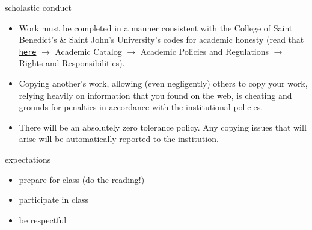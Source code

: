 \documentclass[10pt, t]{beamer}
\begin{document}
  \begin{frame}{scholastic conduct}
    \begin{itemize}
      \item Work must be completed in a manner consistent with the College of
        Saint Benedict's \& Saint John's University's codes for academic honesty
        (read that \href{http://www.csbsju.edu/academics}{\nolinkurl{here}}
        $\rightarrow$ Academic Catalog $\rightarrow$ Academic Policies and
        Regulations $\rightarrow$ Rights and Responsibilities).
      \item Copying another's work, allowing (even negligently) others to copy
        your work, relying heavily on information that you found on the web, is
        cheating and grounds for penalties in accordance with the institutional
        policies.
      \item There will be an absolutely zero tolerance policy. Any copying
        issues that will arise will be automatically reported to the
        institution.
    \end{itemize}
  \end{frame}

  \begin{frame}{expectations}
    \begin{itemize}
      \item prepare for class (do the reading!)
      \item participate in class
      \item be respectful
    \end{itemize}

  \end{frame}
\end{document}
